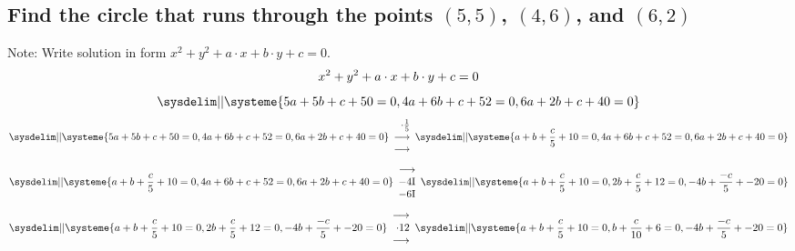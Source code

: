 \documentclass{article}
\begin{document}
\subsection*{Find the circle that runs through the points $(5, 5)$, $(4, 6)$, and $(6, 2)$}
Note: Write solution in form $x^2  +  y^2  +  a\cdot x  +  b\cdot y  +  c   =   0$.
$$x^2  +  y^2  +  a\cdot x  +  b\cdot y  +  c   =   0\\$$
\begin{equation*} 
    \sysdelim||\systeme{
        5 a + 5  b + c + 50 = 0,
        4 a + 6  b + c + 52 = 0,
        6 a + 2  b + c + 40  = 0
    }
\end{equation*}
\begin{equation*}
    \sysdelim||\systeme{
        5 a + 5  b + c + 50 = 0,
        4 a + 6  b + c + 52 = 0,
        6 a + 2  b + c + 40  = 0
    }
    \begin{array}{rr}
        \cdot \frac{1}{5}\\
        \longrightarrow\\
        \longrightarrow\\
    \end{array}
    \sysdelim||\systeme{
        a +  b + \frac{c}{5} + 10 = 0,
        4 a + 6  b + c + 52 = 0,
        6 a + 2  b + c + 40  = 0
    }
\end{equation*}
\begin{equation*}
    \sysdelim||\systeme{
        a +  b + \frac{c}{5} + 10 = 0,
        4 a + 6  b + c + 52 = 0,
        6 a + 2  b + c + 40  = 0
    }
    \begin{array}{rr}
        \longrightarrow\\
        -4$I$\\
        -6$I$\\
    \end{array}
    \sysdelim||\systeme{
        a +  b + \frac{c}{5} + 10 = 0,
        2  b + \frac{c}{5} + 12 = 0,
        -4 b + \frac{-c}{5} + -20  = 0
    }
\end{equation*}
\begin{equation*}
    \sysdelim||\systeme{
        a +  b + \frac{c}{5} + 10 = 0,
        2  b + \frac{c}{5} + 12 = 0,
        -4 b + \frac{-c}{5} + -20  = 0
    }
    \begin{array}{rr}
        \longrightarrow\\
        \cdot{1}{2}\\
        \longrightarrow\\
    \end{array}
    \sysdelim||\systeme{
        a +  b + \frac{c}{5} + 10 = 0,
        b + \frac{c}{10} + 6 = 0,
        -4 b + \frac{-c}{5} + -20  = 0
    }
\end{equation*}
\end{document}
